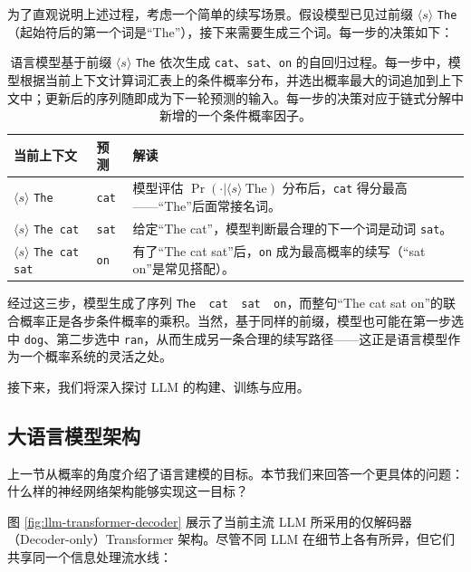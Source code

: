 为了直观说明上述过程，考虑一个简单的续写场景。假设模型已见过前缀 $\langle s \rangle$ \texttt{The}（起始符后的第一个词是``The''），接下来需要生成三个词。每一步的决策如下：

\begin{table}[ht]
\centering
\begingroup
\renewcommand{\arraystretch}{1.4}
\begin{tabular}{l|l|p{10cm}}
\toprule
\textbf{当前上下文} & \textbf{预测} & \textbf{解读} \\
\midrule
$\langle s \rangle$ \texttt{The} & \texttt{cat} & 模型评估 $\Pr(\cdot|\langle s \rangle\ \text{The})$ 分布后，\texttt{cat} 得分最高——``The''后面常接名词。\\
\midrule
$\langle s \rangle$ \texttt{The cat} & \texttt{sat} & 给定``The cat''，模型判断最合理的下一个词是动词 \texttt{sat}。\\
\midrule
$\langle s \rangle$ \texttt{The cat sat} & \texttt{on} & 有了``The cat sat''后，\texttt{on} 成为最高概率的续写（``sat on''是常见搭配）。\\
\bottomrule
\end{tabular}
\endgroup
\caption{语言模型基于前缀 $\langle s \rangle$ \texttt{The} 依次生成 \texttt{cat}、\texttt{sat}、\texttt{on} 的自回归过程。每一步中，模型根据当前上下文计算词汇表上的条件概率分布，并选出概率最大的词追加到上下文中；更新后的序列随即成为下一轮预测的输入。每一步的决策对应于链式分解中新增的一个条件概率因子。}
\label{tab:lm-generation-example}
\end{table}

经过这三步，模型生成了序列 \texttt{The \ cat \ sat \ on}，而整句``The cat sat on''的联合概率正是各步条件概率的乘积。当然，基于同样的前缀，模型也可能在第一步选中 \texttt{dog}、第二步选中 \texttt{ran}，从而生成另一条合理的续写路径——这正是语言模型作为一个概率系统的灵活之处。

接下来，我们将深入探讨 LLM 的构建、训练与应用。

\subsection{大语言模型架构}
\label{sec:decoder-only-transformers}

上一节从概率的角度介绍了语言建模的目标。本节我们来回答一个更具体的问题：什么样的神经网络架构能够实现这一目标？

图 \ref{fig:llm-transformer-decoder} 展示了当前主流 LLM 所采用的仅解码器（Decoder-only）Transformer 架构。尽管不同 LLM 在细节上各有所异，但它们共享同一个信息处理流水线：

